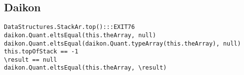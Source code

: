 \subsection{Daikon}

\begin{lstlisting}[style=javastyle, caption=Aserción generada con Daikon, label=lst:daikon]
DataStructures.StackAr.top():::EXIT76
daikon.Quant.eltsEqual(this.theArray, null)
daikon.Quant.eltsEqual(daikon.Quant.typeArray(this.theArray), null)
this.topOfStack == -1
\result == null
daikon.Quant.eltsEqual(this.theArray, \result)

\end{lstlisting}